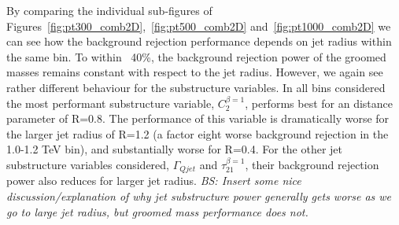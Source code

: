 By comparing the individual sub-figures of Figures~\ref{fig:pt300_comb2D},~\ref{fig:pt500_comb2D}
and~\ref{fig:pt1000_comb2D} we can see how the background rejection
performance depends on jet radius within the same \pt bin. To within
~40\%, the background rejection power of the groomed masses remains
constant with respect to the jet radius. However, we again see rather
different behaviour for the substructure variables. In all \pt bins
considered the most performant substructure variable, $C_2^{\beta=1}$,
performs best for an \antikt distance parameter of R=0.8. The
performance of this variable is dramatically worse for the larger jet
radius of R=1.2 (a factor eight worse background rejection in
the 1.0-1.2 TeV bin), and substantially worse for R=0.4. For the other
jet substructure variables considered, $\Gamma_{Qjet}$ and
$\tau_{21}^{\beta=1}$, their background rejection
power also reduces for larger jet radius.
{\it
  BS: Insert some nice discussion/explanation of why jet substructure
  power generally gets worse as we go to large jet radius, but groomed
mass performance does not.}

%


